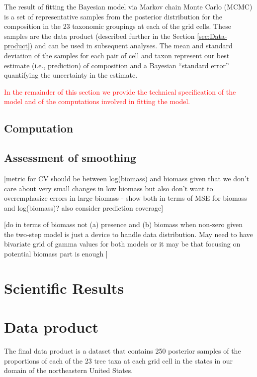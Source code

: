 \documentclass[12pt]{article}\usepackage[]{graphicx}\usepackage[]{color}
\begin{document}
The result of fitting the Bayesian model via Markov chain Monte Carlo
(MCMC) is a set of representative samples from the posterior distribution
for the composition in the 23 taxonomic groupings at each of the grid
cells. These samples are the data product (described further in the
Section \ref{sec:Data-product}) and can be used in subsequent analyses.
The mean and standard deviation of the samples for each pair of cell
and taxon represent our best estimate (i.e., prediction) of composition
and a Bayesian ``standard error'' quantifying the uncertainty in
the estimate. 

\textcolor{red}{In the remainder of this section we provide the technical
specification of the model and of the computations involved in fitting
the model.}


\subsection{Computation}


\subsection{Assessment of smoothing}

{[}metric for CV should be between log(biomass) and biomass given
that we don't care about very small changes in low biomass but also
don't want to overemphasize errors in large biomass - show both in
terms of MSE for biomass and log(biomass)? also consider prediction
coverage{]}

{[}do in terms of biomass not (a) presence and (b) biomass when non-zero
given the two-step model is just a device to handle data distribution.
May need to have bivariate grid of gamma values for both models or
it may be that focusing on potential biomass part is enough {]}


\section{Scientific Results}


\section{Data product\label{sec:Data-product}}

The final data product is a dataset that contains 250 posterior samples
of the proportions of each of the 23 tree taxa at each grid cell in
the states in our domain of the northeastern United States.
\end{document}
